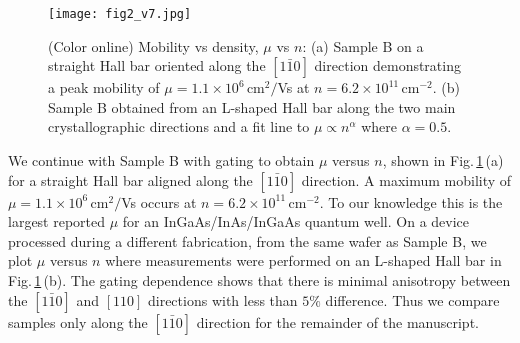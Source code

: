 \documentclass[
floatfix,
aps,
prl,
twocolumn,
superscriptaddress,
amssymb,
 groupaddress,
]{revtex4}
\begin{document}
\begin{figure}[t]
\vspace{-0.1 in}
\texttt{[image: fig2\_v7.jpg]}
\vspace{-0.25 in}
\caption{(Color online)
Mobility vs density, $\mu$ vs $n$:
(a) Sample B on a straight Hall bar oriented along the $[1\bar{1}0]$ direction demonstrating a peak mobility of $\mu=1.1 \times 10^{6}\,$cm$^{2}/$Vs at $n = 6.2 \times 10^{11}\,$cm$^{-2}$.
(b) Sample B obtained from an L-shaped Hall bar along the two main crystallographic directions and a fit line to $\mu \propto n^{\alpha}$ where $\alpha=0.5$.
}
\vspace{-0.1 in}
\label{fig2}
\end{figure}
We continue with Sample B with gating to obtain $\mu$ versus $n$, shown in Fig.\,\ref{fig2}\,(a) for a straight Hall bar aligned along the $[1\bar{1}0]$ direction.
A maximum mobility of $\mu=1.1 \times 10^{6}\,$cm$^{2}/$Vs occurs at $n = 6.2 \times 10^{11}\,$cm$^{-2}$.
To our knowledge this is the largest reported $\mu$ for an InGaAs/InAs/InGaAs quantum well. 
On a device processed during a different fabrication, from the same wafer as Sample B, we plot $\mu$ versus $n$ where measurements were performed on an L-shaped Hall bar in Fig.\,\ref{fig2}\,(b).
The gating dependence shows that there is minimal anisotropy between the $[1\bar{1}0]$ and $[110]$ directions with less than $5\%$ difference. 
Thus we compare samples only along the $[1\bar{1}0]$ direction for the remainder of the manuscript.
\end{document}
